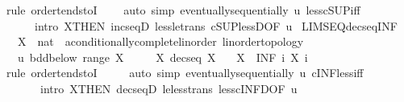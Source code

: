 \begin{isabellebody}
\ {\isacharparenleft}{\kern0pt}rule\ order{\isacharunderscore}{\kern0pt}tendstoI{\isacharparenright}{\kern0pt}\isanewline
\ \ \ \ {\isacharparenleft}{\kern0pt}auto\ simp{\isacharcolon}{\kern0pt}\ eventually{\isacharunderscore}{\kern0pt}sequentially\ u\ less{\isacharunderscore}{\kern0pt}cSUP{\isacharunderscore}{\kern0pt}iff\isanewline
\ \ \ \ \ \ intro{\isacharcolon}{\kern0pt}\ X{\isacharbrackleft}{\kern0pt}THEN\ incseqD{\isacharbrackright}{\kern0pt}\ less{\isacharunderscore}{\kern0pt}le{\isacharunderscore}{\kern0pt}trans\ cSUP{\isacharunderscore}{\kern0pt}lessD{\isacharbrackleft}{\kern0pt}OF\ u{\isacharbrackright}{\kern0pt}{\isacharparenright}{\kern0pt}%
\endisatagproof
{\isafoldproof}%
%
\isadelimproof
\isanewline
%
\endisadelimproof
\isanewline
{}\isamarkupfalse%
\ LIMSEQ{\isacharunderscore}{\kern0pt}decseq{\isacharunderscore}{\kern0pt}INF{\isacharcolon}{\kern0pt}\isanewline
\ \ \ X\ {\isacharcolon}{\kern0pt}{\isacharcolon}{\kern0pt}\ {\isachardoublequoteopen}nat\ {\isasymRightarrow}\ {\isacharprime}{\kern0pt}a{\isacharcolon}{\kern0pt}{\isacharcolon}{\kern0pt}{\isacharbraceleft}{\kern0pt}conditionally{\isacharunderscore}{\kern0pt}complete{\isacharunderscore}{\kern0pt}linorder{\isacharcomma}{\kern0pt}\ linorder{\isacharunderscore}{\kern0pt}topology{\isacharbraceright}{\kern0pt}{\isachardoublequoteclose}\isanewline
\ \ \ u{\isacharcolon}{\kern0pt}\ {\isachardoublequoteopen}bdd{\isacharunderscore}{\kern0pt}below\ {\isacharparenleft}{\kern0pt}range\ X{\isacharparenright}{\kern0pt}{\isachardoublequoteclose}\isanewline
\ \ \ \ \ X{\isacharcolon}{\kern0pt}\ {\isachardoublequoteopen}decseq\ X{\isachardoublequoteclose}\isanewline
\ \ \ {\isachardoublequoteopen}X\ {\isasymlonglonglongrightarrow}\ {\isacharparenleft}{\kern0pt}INF\ i{\isachardot}{\kern0pt}\ X\ i{\isacharparenright}{\kern0pt}{\isachardoublequoteclose}\isanewline
%
\isadelimproof
\ \ %
\endisadelimproof
%
\isatagproof
{}\isamarkupfalse%
\ {\isacharparenleft}{\kern0pt}rule\ order{\isacharunderscore}{\kern0pt}tendstoI{\isacharparenright}{\kern0pt}\isanewline
\ \ \ \ \ {\isacharparenleft}{\kern0pt}auto\ simp{\isacharcolon}{\kern0pt}\ eventually{\isacharunderscore}{\kern0pt}sequentially\ u\ cINF{\isacharunderscore}{\kern0pt}less{\isacharunderscore}{\kern0pt}iff\isanewline
\ \ \ \ \ \ \ intro{\isacharcolon}{\kern0pt}\ X{\isacharbrackleft}{\kern0pt}THEN\ decseqD{\isacharbrackright}{\kern0pt}\ le{\isacharunderscore}{\kern0pt}less{\isacharunderscore}{\kern0pt}trans\ less{\isacharunderscore}{\kern0pt}cINF{\isacharunderscore}{\kern0pt}D{\isacharbrackleft}{\kern0pt}OF\ u{\isacharbrackright}{\kern0pt}{\isacharparenright}{\kern0pt}%

\end{isabellebody}
